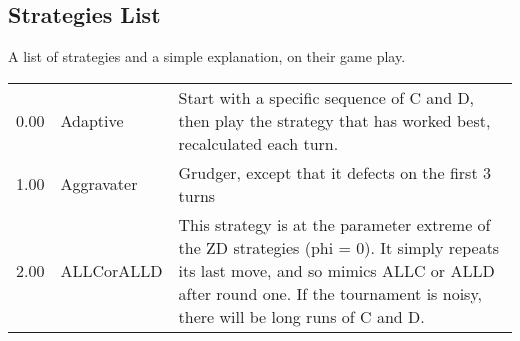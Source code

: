\subsection{Strategies List}
\label{append:strategies}
A list of strategies and a simple explanation, on their game play.
\begin{tabular}{rll}
				\toprule
	0.00   & Adaptive                    & Start with a specific sequence of C and D, then play the strategy that
	has worked best, recalculated each turn.                                                                                                                                                                                                                                                                                                                                                                                                                                                                                                                                                                                                                                                                                                                                                                                                                                                                                                      \\
	1.00   & Aggravater                  & Grudger, except that it defects on the first 3 turns                                                                              \\
	2.00   & ALLCorALLD                  & This strategy is at the parameter extreme of the ZD strategies (phi = 0).
	It simply repeats its last move, and so mimics ALLC or ALLD after round one.
	If the tournament is noisy, there will be long runs of C and D.


\end{tabular}

